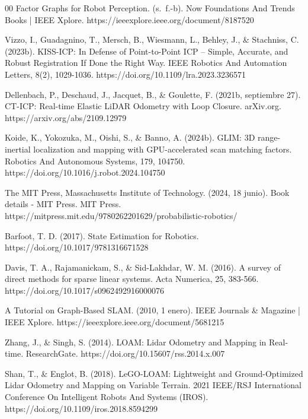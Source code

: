 \documentclass[journal]{IEEEtran}
\begin{document}
\begin{thebibliography}{00}
     Factor Graphs for Robot Perception. (s. f.-b). Now Foundations And Trends Books | IEEE Xplore. https://ieeexplore.ieee.org/document/8187520
    
     Vizzo, I., Guadagnino, T., Mersch, B., Wiesmann, L., Behley, J., \& Stachniss, C. (2023b). KISS-ICP: In Defense of Point-to-Point ICP – Simple, Accurate, and Robust Registration If Done the Right Way. IEEE Robotics And Automation Letters, 8(2), 1029-1036. https://doi.org/10.1109/lra.2023.3236571

     Dellenbach, P., Deschaud, J., Jacquet, B., \& Goulette, F. (2021b, septiembre 27). CT-ICP: Real-time Elastic LiDAR Odometry with Loop Closure. arXiv.org. https://arxiv.org/abs/2109.12979

     Koide, K., Yokozuka, M., Oishi, S., \& Banno, A. (2024b). GLIM: 3D range-inertial localization and mapping with GPU-accelerated scan matching factors. Robotics And Autonomous Systems, 179, 104750. https://doi.org/10.1016/j.robot.2024.104750
    
     The MIT Press, Massachusetts Institute of Technology. (2024, 18 junio). Book details - MIT Press. MIT Press. https://mitpress.mit.edu/9780262201629/probabilistic-robotics/
    
     Barfoot, T. D. (2017). State Estimation for Robotics. https://doi.org/10.1017/9781316671528  
    
     Davis, T. A., Rajamanickam, S., \& Sid-Lakhdar, W. M. (2016). A survey of direct methods for sparse linear systems. Acta Numerica, 25, 383-566. https://doi.org/10.1017/s0962492916000076

     A Tutorial on Graph-Based SLAM. (2010, 1 enero). IEEE Journals \& Magazine | IEEE Xplore. https://ieeexplore.ieee.org/document/5681215

     Zhang, J., \& Singh, S. (2014). LOAM: Lidar Odometry and Mapping in Real-time. ResearchGate. https://doi.org/10.15607/rss.2014.x.007
    
     Shan, T., \& Englot, B. (2018). LeGO-LOAM: Lightweight and Ground-Optimized Lidar Odometry and Mapping on Variable Terrain. 2021 IEEE/RSJ International Conference On Intelligent Robots And Systems (IROS). https://doi.org/10.1109/iros.2018.8594299


\end{thebibliography}
\end{document}

